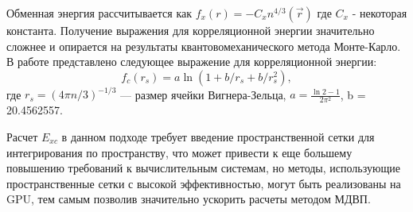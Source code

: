 Обменная энергия рассчитывается как $f_x(r) = -C_xn^{4/3}(\vec{r})$ где $C_x$ - некоторая константа.
Получение выражения для корреляционной энергии значительно сложнее и опирается на результаты квантовомеханического метода Монте-Карло. В работе \cite{chachiyo2017simple} представлено следующее выражение для корреляционной энергии:
\begin{equation}
f_c(r_s) = a\ln(1+b/r_s+b/r_s^2),
\end{equation}
где $r_s = (4\pi n/3)^{-1/3}$ --- размер ячейки Вигнера-Зельца, $a = \frac{\ln2 - 1}{ 2\pi^2}$, b = 20.4562557.

Расчет $E_{xc}$ в данном подходе требует введение пространственной сетки для интегрирования по пространству, что может привести к еще большему повышению требований к вычислительным системам, но методы, использующие пространственные сетки с высокой эффективностью, могут быть реализованы на GPU, тем самым позволив значительно ускорить расчеты методом МДВП.
